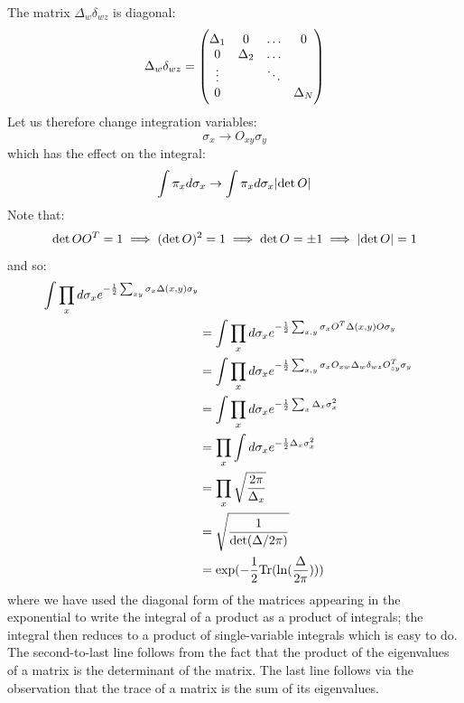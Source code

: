 The matrix $\Delta_w \delta_{wz}$ is diagonal:
\begin{equation}
    \Delta_w \delta_{wz} = \begin{pmatrix}\Delta_1 & 0 & \ldots & 0
    \\ 0 & \Delta_2 & \ldots & 
    \\ \vdots & & \ddots & 
    \\ 0 & & & \Delta_N\end{pmatrix}
\end{equation}
Let us therefore change integration variables:
\begin{equation}
    \sigma_x \to O_{xy}\sigma_y
\end{equation}
which has the effect on the integral:
\begin{equation}
    \int \pi_x d\sigma_x \to \int \pi_x d\sigma_x \lvert \det O \rvert
\end{equation}
Note that:
\begin{equation}
    \det OO^T = 1 \implies (\det O)^2 = 1 \implies \det O = \pm 1 \implies \lvert \det O \rvert = 1
\end{equation}
and so:
\begin{equation}
    \begin{split}
        \int \prod_x d\sigma_x e^{-\frac{1}{2}\sum_{xy} \sigma_x \Delta(x, y)\sigma_y} 
        \\ &= \int \prod_x d\sigma_x e^{-\frac{1}{2}\sum_{x, y}\sigma_x O^T \Delta(x, y)O \sigma_y}
        \\ &= \int \prod_xd\sigma_x e^{-\frac{1}{2}\sum_{x, y}\sigma_x O_{x w}\Delta_{w}\delta_{wz}O_{zy}^T \sigma_y}
        \\ &= \int \prod_x d\sigma_x e^{-\frac{1}{2}\sum_x \Delta_x \sigma_x^2}
        \\ &= \prod_x \int d\sigma_x e^{-\frac{1}{2}\Delta_x \sigma_x^2}
        \\ &= \prod_x \sqrt{\frac{2\pi}{\Delta_x}}
        \\ &= \sqrt{\frac{1}{\det(\Delta/2\pi)}}
        \\ &= \exp(-\frac{1}{2}\mathrm{Tr}(\ln(\frac{\Delta}{2\pi})))
    \end{split}
\end{equation}
where we have used the diagonal form of the matrices appearing in the exponential to write the integral of a product as a product of integrals; the integral then reduces to a product of single-variable integrals which is easy to do. The second-to-last line follows from the fact that the product of the eigenvalues of a matrix is the determinant of the matrix. The last line follows via the observation that the trace of a matrix is the sum of its eigenvalues.

